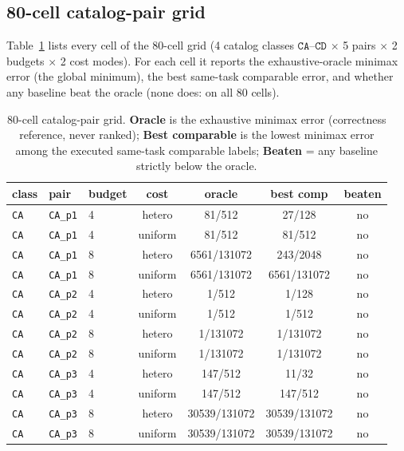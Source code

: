 \documentclass[11pt]{article}
\begin{document}
\subsection{80-cell catalog-pair grid}\label{sec:supp-grid}
Table~\ref{tab:supp-grid} lists every cell of the 80-cell grid (4 catalog classes
$\texttt{CA}$--$\texttt{CD}$ $\times$ 5 pairs $\times$ 2 budgets $\times$ 2 cost modes). For
each cell it reports the exhaustive-oracle minimax error (the global minimum), the best same-task
comparable error, and whether any baseline beat the oracle (none does: \texttt{}
on all 80 cells).

\begin{table}[ht]
\centering\footnotesize
\caption{80-cell catalog-pair grid. \textbf{Oracle} is the exhaustive minimax error (correctness
reference, never ranked); \textbf{Best comparable} is the lowest minimax error among the executed
same-task comparable labels; \textbf{Beaten} = any baseline strictly below the oracle.}
\label{tab:supp-grid}
\begin{tabular}{@{}lllcccc@{}}
\toprule
class & pair & budget & cost & oracle & best comp & beaten \\
\midrule
\texttt{CA} & \texttt{CA\_p1} & 4 & hetero & 81/512 & 27/128 & no \\
\texttt{CA} & \texttt{CA\_p1} & 4 & uniform & 81/512 & 81/512 & no \\
\texttt{CA} & \texttt{CA\_p1} & 8 & hetero & 6561/131072 & 243/2048 & no \\
\texttt{CA} & \texttt{CA\_p1} & 8 & uniform & 6561/131072 & 6561/131072 & no \\
\texttt{CA} & \texttt{CA\_p2} & 4 & hetero & 1/512 & 1/128 & no \\
\texttt{CA} & \texttt{CA\_p2} & 4 & uniform & 1/512 & 1/512 & no \\
\texttt{CA} & \texttt{CA\_p2} & 8 & hetero & 1/131072 & 1/131072 & no \\
\texttt{CA} & \texttt{CA\_p2} & 8 & uniform & 1/131072 & 1/131072 & no \\
\texttt{CA} & \texttt{CA\_p3} & 4 & hetero & 147/512 & 11/32 & no \\
\texttt{CA} & \texttt{CA\_p3} & 4 & uniform & 147/512 & 147/512 & no \\
\texttt{CA} & \texttt{CA\_p3} & 8 & hetero & 30539/131072 & 30539/131072 & no \\
\texttt{CA} & \texttt{CA\_p3} & 8 & uniform & 30539/131072 & 30539/131072 & no \\

\end{tabular}
\end{table}
\end{document}
